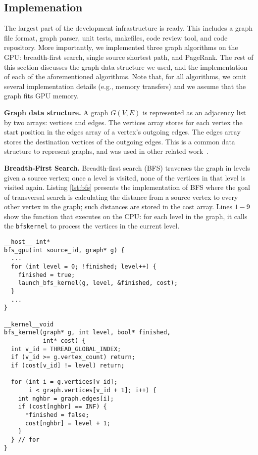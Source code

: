 \subsection{Implemenation}
\label{sec:implementation}

The largest part of the development infrastructure is ready. This includes a graph file format, graph parser, unit tests, makefiles, code review tool, and code repository. More importantly, we implemented three graph algorithms on the GPU: breadth-first search, single source shortest path, and PageRank. The rest of this section discusses the graph data structure we used, and the implementation of each of the aforementioned algorithms. Note that, for all algorithms, we omit several implementation details (e.g., memory transfers) and we assume that the graph fits GPU memory.

\textbf{Graph data structure.} A graph $G(V,E)$ is represented as an adjacency list by two arrays: vertices and edges. The vertices array stores for each vertex the start position in the edges array of a vertex's outgoing edges. The edges array stores the destination vertices of the outgoing edges. This is a common data structure to represent graphs, and was used in other related work~\cite{Harish2007, Sungpack2010}.

{\bf Breadth-First Search.} Breadth-first search (BFS) traverses the graph in levels given a source vertex; once a level is visited, none of the vertices in that level is visited again. Listing \ref{lst:bfs} presents the implementation of BFS where the goal of transversal search is calculating the distance from a source vertex to every other vertex in the graph; such distances are stored in the cost array. Lines $1-9$ show the function that executes on the CPU: for each level in the graph, it calls the \texttt{bfskernel} to process the vertices in the current level.


\begin{lstlisting}[caption=Breadth-First Search Implementation,label=lst:bfs]
__host__ int*
bfs_gpu(int source_id, graph* g) {
  ...
  for (int level = 0; !finished; level++) {
    finished = true;
    launch_bfs_kernel(g, level, &finished, cost);
  }
  ...
}

__kernel__void
bfs_kernel(graph* g, int level, bool* finished,
           int* cost) {
  int v_id = THREAD_GLOBAL_INDEX;
  if (v_id >= g.vertex_count) return;
  if (cost[v_id] != level) return;

  for (int i = g.vertices[v_id]; 
       i < graph.vertices[v_id + 1]; i++) {
    int nghbr = graph.edges[i];
    if (cost[nghbr] == INF) {
      *finished = false;
      cost[nghbr] = level + 1;
    }
  } // for
}
\end{lstlisting}

